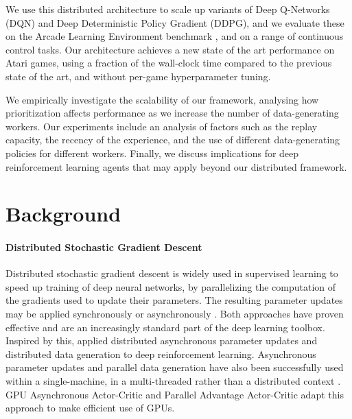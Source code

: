 \documentclass{article} %
\begin{document}
We use this distributed architecture to scale up variants of Deep Q-Networks (DQN) and Deep Deterministic Policy Gradient (DDPG), and we evaluate these on the Arcade Learning Environment benchmark \citep{bellemare2013arcade}, and on a range of continuous control tasks. Our architecture achieves a new state of the art performance on Atari games, using a fraction of the wall-clock time compared to the previous state of the art, and without per-game hyperparameter tuning.

We empirically investigate the scalability of our framework, analysing how prioritization affects performance as we increase the number of data-generating workers. Our experiments include an analysis of factors such as the replay capacity, the recency of the experience, and the use of different data-generating policies for different workers. Finally, we discuss implications for deep reinforcement learning agents that may apply beyond our distributed framework.

\section{Background}

\paragraph{Distributed Stochastic Gradient Descent}

Distributed stochastic gradient descent is widely used in supervised learning to speed up training of deep neural networks, by parallelizing the computation of the gradients used to update their parameters. The resulting parameter updates may be applied synchronously \citep{krizhevsky2014one} or asynchronously \citep{Dean:2012:LSD:2999134.2999271}. Both approaches have proven effective and are an increasingly standard part of the deep learning toolbox. Inspired by this, \cite{gorila} applied distributed asynchronous parameter updates and distributed data generation to deep reinforcement learning. Asynchronous parameter updates and parallel data generation have also been successfully used within a single-machine, in a multi-threaded rather than a distributed context \citep{a3c}. GPU Asynchronous Actor-Critic \citep[GA3C;][]{ga3c} and Parallel Advantage Actor-Critic \citep[PAAC;][]{paac} adapt this approach to make efficient use of GPUs.
\end{document}
